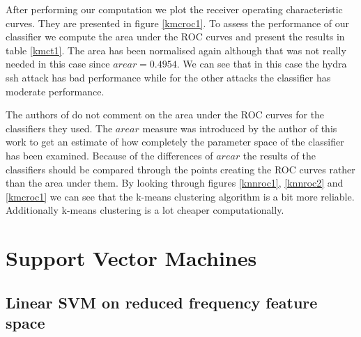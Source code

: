 \documentclass[reqno,openany,12pt]{amsbook}
\begin{document}
%

After performing our computation we plot the receiver operating characteristic curves. They are presented in figure \ref{kmcroc1}. To assess the performance of our classifier we compute the area under the ROC curves and present the results in table \ref{kmct1}. The area has been normalised again although that was not really needed in this case since $arear = 0.4954$. We can see that in this case the hydra ssh attack has bad performance while for the other attacks the classifier has moderate performance.

The authors of \cite{adf1} do not comment on the area under the ROC curves for the classifiers they used.
The $arear$ measure was introduced by the author of this work to get an estimate of how completely the parameter space of the classifier has been examined. Because of the differences of $arear$ the results of the classifiers should be compared through the points creating the ROC curves rather than the area under them. By looking through figures \ref{knnroc1}, \ref{knnroc2} and \ref{kmcroc1} we can see that the k-means clustering algorithm is a bit more reliable.
Additionally k-means clustering is a lot cheaper computationally.


\section{Support Vector Machines}

\subsection{Linear SVM on reduced frequency feature space}\mbox{}
\end{document}
